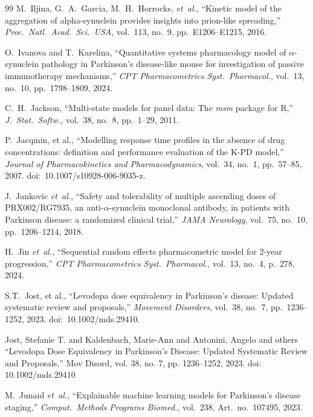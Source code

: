 \begin{thebibliography}{99}
M.~Iljina, G.~A.~Garcia, M.~H.~Horrocks, \textit{et~al.}, ``Kinetic model of the aggregation of alpha-synuclein provides insights into prion-like spreading,'' \textit{Proc.\ Natl.\ Acad.\ Sci.\ USA}, vol.~113, no.~9, pp.~E1206--E1215, 2016.

O.~Ivanova and T.~Karelina, ``Quantitative systems pharmacology model of $\alpha$-synuclein pathology in Parkinson's disease-like mouse for investigation of passive immunotherapy mechanisms,'' \textit{CPT Pharmacometrics Syst.\ Pharmacol.}, vol.~13, no.~10, pp.~1798--1809, 2024.


C.~H.~Jackson, ``Multi-state models for panel data: The \textit{msm} package for R,'' \textit{J.\ Stat.\ Softw.}, vol.~38, no.~8, pp.~1--29, 2011.

P.~Jacqmin, et al., ``Modelling response time profiles in the absence of drug concentrations: definition and performance evaluation of the K-PD model,'' \textit{Journal of Pharmacokinetics and Pharmacodynamics}, vol.~34, no.~1, pp.~57--85, 2007. doi:~10.1007/s10928-006-9035-z.

J.~Jankovic \textit{et~al.}, ``Safety and tolerability of multiple ascending doses of PRX002/RG7935, an anti-$\alpha$-synuclein monoclonal antibody, in patients with Parkinson disease: a randomized clinical trial,'' \textit{JAMA Neurology}, vol.~75, no.~10, pp.~1206--1214, 2018.

H.~Jin \textit{et~al.}, ``Sequential random effects pharmacometric model for 2-year progression,'' \textit{CPT Pharmacometrics Syst.\ Pharmacol.}, vol.~13, no.~4, p.~278, 2024.

S.T.~Jost, et al., ``Levodopa dose equivalency in Parkinson's disease: Updated systematic review and proposals,'' \textit{Movement Disorders}, vol.~38, no.~7, pp.~1236--1252, 2023. doi:~10.1002/mds.29410.

 Jost, Stefanie T. and Kaldenbach, Marie-Ann and Antonini, Angelo and others ``Levodopa Dose Equivalency in Parkinson's Disease: Updated Systematic Review and Proposals,'' Mov Disord, vol. 38, no. 7, pp. 1236--1252, 2023. doi: 10.1002/mds.29410

M.~Junaid \textit{et~al.}, ``Explainable machine learning models for Parkinson's disease staging,'' \textit{Comput.\ Methods Programs Biomed.}, vol.~238, Art.\ no.~107495, 2023.


\end{thebibliography}
